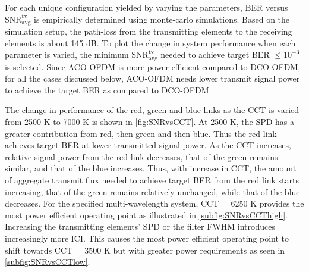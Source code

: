 For each unique configuration yielded by varying the parameters, BER versus $\text{SNR}^{\text{tx}}_{\text{avg}}$ is empirically determined using monte-carlo simulations. Based on the simulation setup, the path-loss from the transmitting elements to the receiving elements is about 145 dB. To plot the change in system performance when each parameter is varied, the minimum $\text{SNR}^{\text{tx}}_{\text{avg}}$ needed to achieve target BER $\leq 10^{-3}$ is selected. Since ACO-OFDM is more power efficient compared to DCO-OFDM, for all the cases discussed below, ACO-OFDM needs lower transmit signal power to achieve the target BER as compared to DCO-OFDM.

The change in performance of the red, green and blue links as the CCT is varied from 2500 K to 7000 K is shown in \figurename{ \ref{fig:SNRvsCCT}}. At 2500 K, the SPD has a greater contribution from red, then green and then blue. Thus the red link achieves target BER at lower transmitted signal power. As the CCT increases, relative signal power from the red link decreases, that of the green remains similar, and that of the blue increases. Thus, with increase in CCT, the amount of aggregate transmit flux needed to achieve target BER from the red link starts increasing, that of the green remains relatively unchanged, while that of the blue decreases. For the specified multi-wavelength system, CCT = 6250 K provides the most power efficient operating point as illustrated in \figurename{ \ref{subfig:SNRvsCCThigh}}. Increasing the transmitting elements' SPD or the filter FWHM introduces increasingly more ICI. This causes the most power efficient operating point to shift towards CCT = 3500 K but with greater power requirements as seen in \figurename{ \ref{subfig:SNRvsCCTlow}}.

